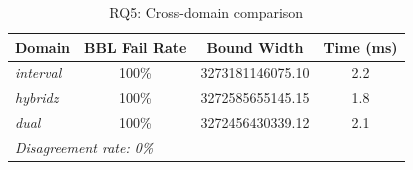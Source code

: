 \begin{table}[t]
\centering
\caption{RQ5: Cross-domain comparison}
\label{tab:rq5-domains}
\small
\begin{tabular}{lccc}
\toprule
\textbf{Domain} & \textbf{BBL Fail Rate} & \textbf{Bound Width} & \textbf{Time (ms)} \\
\midrule
\textit{interval} & 100\% & 3273181146075.10 & 2.2 \\
\textit{hybridz} & 100\% & 3272585655145.15 & 1.8 \\
\textit{dual} & 100\% & 3272456430339.12 & 2.1 \\
\midrule
\multicolumn{4}{l}{\textit{Disagreement rate: 0\%}} \\
\bottomrule
\end{tabular}
\end{table}